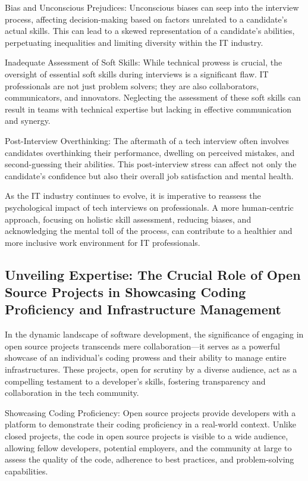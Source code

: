 \documentclass[
    a4paper, %
    10pt, %
    unnumberedsections, %
    twoside, %
]{LTJournalArticle}
\begin{document}
Bias and Unconscious Prejudices:
Unconscious biases can seep into the interview process, affecting decision-making based on factors unrelated to a candidate's actual skills. This can lead to a skewed representation of a candidate's abilities, perpetuating inequalities and limiting diversity within the IT industry.

Inadequate Assessment of Soft Skills:
While technical prowess is crucial, the oversight of essential soft skills during interviews is a significant flaw. IT professionals are not just problem solvers; they are also collaborators, communicators, and innovators. Neglecting the assessment of these soft skills can result in teams with technical expertise but lacking in effective communication and synergy.

Post-Interview Overthinking:
The aftermath of a tech interview often involves candidates overthinking their performance, dwelling on perceived mistakes, and second-guessing their abilities. This post-interview stress can affect not only the candidate's confidence but also their overall job satisfaction and mental health.

As the IT industry continues to evolve, it is imperative to reassess the psychological impact of tech interviews on professionals. A more human-centric approach, focusing on holistic skill assessment, reducing biases, and acknowledging the mental toll of the process, can contribute to a healthier and more inclusive work environment for IT professionals.




\subsection{Unveiling Expertise: The Crucial Role of Open Source Projects in Showcasing Coding Proficiency and Infrastructure Management}

In the dynamic landscape of software development, the significance of engaging in open source projects transcends mere collaboration—it serves as a powerful showcase of an individual's coding prowess and their ability to manage entire infrastructures. These projects, open for scrutiny by a diverse audience, act as a compelling testament to a developer's skills, fostering transparency and collaboration in the tech community.

Showcasing Coding Proficiency:
Open source projects provide developers with a platform to demonstrate their coding proficiency in a real-world context. Unlike closed projects, the code in open source projects is visible to a wide audience, allowing fellow developers, potential employers, and the community at large to assess the quality of the code, adherence to best practices, and problem-solving capabilities.
\end{document}
